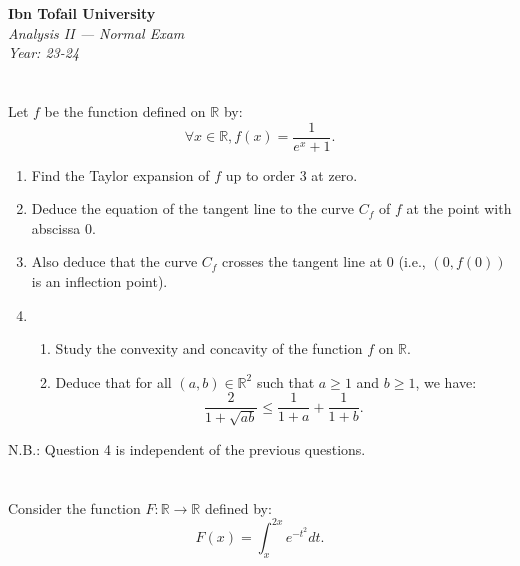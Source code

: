 \documentclass[12pt]{article}
\begin{document}
\begin{center}
  \Large\textbf{Ibn Tofail University} \\[1em]
  \large\textit{Analysis II — Normal Exam} \\[0.5em]
  \large\textit{Year: 23-24} \\[2em]
\end{center}

\vspace{0.5cm}

\section{}
Let $f$ be the function defined on $\mathbb{R}$ by:
$$\forall x \in \mathbb{R}, f(x) = \frac{1}{e^x + 1}.$$

\begin{enumerate}
\item Find the Taylor expansion of $f$ up to order 3 at zero.
\item Deduce the equation of the tangent line to the curve $C_f$ of $f$ at the point with abscissa 0.
\item Also deduce that the curve $C_f$ crosses the tangent line at 0 (i.e., $(0, f(0))$ is an inflection point).
\item \begin{enumerate}
   \item Study the convexity and concavity of the function $f$ on $\mathbb{R}$.
   \item Deduce that for all $(a, b) \in \mathbb{R}^2$ such that $a \geq 1$ and $b \geq 1$, we have:
   $$\frac{2}{1 + \sqrt{ab}} \leq \frac{1}{1 + a} + \frac{1}{1 + b}.$$
   \end{enumerate}
\end{enumerate}
N.B.: Question 4 is independent of the previous questions.

\newpage

\begin{answerbox}


\end{answerbox}

\newpage

\section{}
Consider the function $F: \mathbb{R} \rightarrow \mathbb{R}$ defined by:
$$F(x) = \int_{x}^{2x} e^{-t^2} dt.$$
\end{document}
